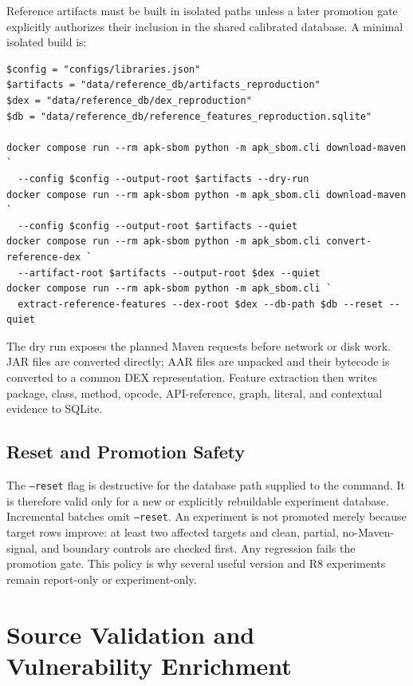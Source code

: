 Reference artifacts must be built in isolated paths unless a later promotion
gate explicitly authorizes their inclusion in the shared calibrated database.
A minimal isolated build is:

\begin{lstlisting}[style=thesiscode,
caption={Isolated reference-database construction.}]
$config = "configs/libraries.json"
$artifacts = "data/reference_db/artifacts_reproduction"
$dex = "data/reference_db/dex_reproduction"
$db = "data/reference_db/reference_features_reproduction.sqlite"

docker compose run --rm apk-sbom python -m apk_sbom.cli download-maven `
  --config $config --output-root $artifacts --dry-run
docker compose run --rm apk-sbom python -m apk_sbom.cli download-maven `
  --config $config --output-root $artifacts --quiet
docker compose run --rm apk-sbom python -m apk_sbom.cli convert-reference-dex `
  --artifact-root $artifacts --output-root $dex --quiet
docker compose run --rm apk-sbom python -m apk_sbom.cli `
  extract-reference-features --dex-root $dex --db-path $db --reset --quiet
\end{lstlisting}

The dry run exposes the planned Maven requests before network or disk work.
JAR files are converted directly; AAR files are unpacked and their bytecode is
converted to a common DEX representation. Feature extraction then writes
package, class, method, opcode, API-reference, graph, literal, and contextual
evidence to SQLite.

\subsection{Reset and Promotion Safety}

The \texttt{--reset} flag is destructive for the database path supplied to
the command. It is therefore valid only for a new or explicitly rebuildable
experiment database. Incremental batches omit \texttt{--reset}. An experiment
is not promoted merely because target rows improve: at least two affected
targets and clean, partial, no-Maven-signal, and boundary controls are checked
first. Any regression fails the promotion gate. This policy is why several
useful version and R8 experiments remain report-only or experiment-only.

\section{Source Validation and Vulnerability Enrichment}

